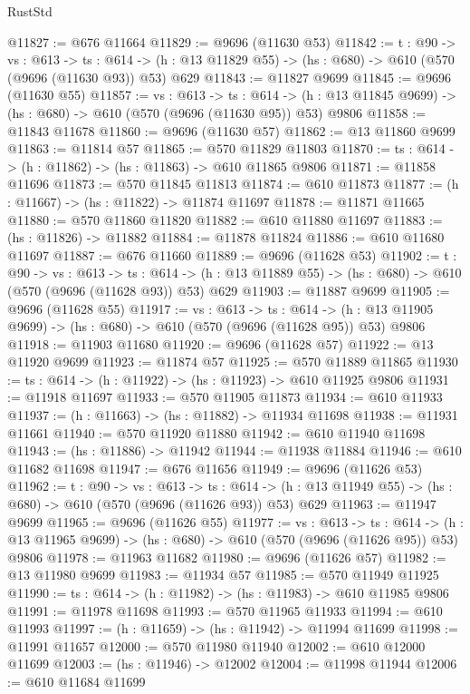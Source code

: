 \begin{lexlean}{RustStd}
\begin{coremodule}
@11827 := @676 @11664
@11829 := @9696 (@11630 @53)
@11842 := {t : @90} ->
  {vs : @613} ->
  {ts : @614} -> (h : @13 @11829 @55) -> (hs : @680) -> @610 (@570 (@9696 (@11630 @93)) @53) @629
@11843 := @11827 @9699
@11845 := @9696 (@11630 @55)
@11857 := {vs : @613} ->
  {ts : @614} -> (h : @13 @11845 @9699) -> (hs : @680) -> @610 (@570 (@9696 (@11630 @95)) @53) @9806
@11858 := @11843 @11678
@11860 := @9696 (@11630 @57)
@11862 := @13 @11860 @9699
@11863 := @11814 @57
@11865 := @570 @11829 @11803
@11870 := {ts : @614} -> (h : @11862) -> (hs : @11863) -> @610 @11865 @9806
@11871 := @11858 @11696
@11873 := @570 @11845 @11813
@11874 := @610 @11873
@11877 := (h : @11667) -> (hs : @11822) -> @11874 @11697
@11878 := @11871 @11665
@11880 := @570 @11860 @11820
@11882 := @610 @11880 @11697
@11883 := (hs : @11826) -> @11882
@11884 := @11878 @11824
@11886 := @610 @11680 @11697
@11887 := @676 @11660
@11889 := @9696 (@11628 @53)
@11902 := {t : @90} ->
  {vs : @613} ->
  {ts : @614} -> (h : @13 @11889 @55) -> (hs : @680) -> @610 (@570 (@9696 (@11628 @93)) @53) @629
@11903 := @11887 @9699
@11905 := @9696 (@11628 @55)
@11917 := {vs : @613} ->
  {ts : @614} -> (h : @13 @11905 @9699) -> (hs : @680) -> @610 (@570 (@9696 (@11628 @95)) @53) @9806
@11918 := @11903 @11680
@11920 := @9696 (@11628 @57)
@11922 := @13 @11920 @9699
@11923 := @11874 @57
@11925 := @570 @11889 @11865
@11930 := {ts : @614} -> (h : @11922) -> (hs : @11923) -> @610 @11925 @9806
@11931 := @11918 @11697
@11933 := @570 @11905 @11873
@11934 := @610 @11933
@11937 := (h : @11663) -> (hs : @11882) -> @11934 @11698
@11938 := @11931 @11661
@11940 := @570 @11920 @11880
@11942 := @610 @11940 @11698
@11943 := (hs : @11886) -> @11942
@11944 := @11938 @11884
@11946 := @610 @11682 @11698
@11947 := @676 @11656
@11949 := @9696 (@11626 @53)
@11962 := {t : @90} ->
  {vs : @613} ->
  {ts : @614} -> (h : @13 @11949 @55) -> (hs : @680) -> @610 (@570 (@9696 (@11626 @93)) @53) @629
@11963 := @11947 @9699
@11965 := @9696 (@11626 @55)
@11977 := {vs : @613} ->
  {ts : @614} -> (h : @13 @11965 @9699) -> (hs : @680) -> @610 (@570 (@9696 (@11626 @95)) @53) @9806
@11978 := @11963 @11682
@11980 := @9696 (@11626 @57)
@11982 := @13 @11980 @9699
@11983 := @11934 @57
@11985 := @570 @11949 @11925
@11990 := {ts : @614} -> (h : @11982) -> (hs : @11983) -> @610 @11985 @9806
@11991 := @11978 @11698
@11993 := @570 @11965 @11933
@11994 := @610 @11993
@11997 := (h : @11659) -> (hs : @11942) -> @11994 @11699
@11998 := @11991 @11657
@12000 := @570 @11980 @11940
@12002 := @610 @12000 @11699
@12003 := (hs : @11946) -> @12002
@12004 := @11998 @11944
@12006 := @610 @11684 @11699

\end{coremodule}
\end{lexlean}
